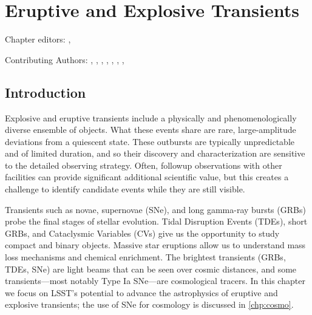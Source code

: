 
\chapter[Eruptive and Explosive Transients]{Eruptive and Explosive Transients}
\def\chpname{transients}\label{chp:\chpname}


Chapter editors:
,

Contributing Authors:
,
,
,
,
,
,
,

\section{Introduction}


Explosive and eruptive transients include a physically and
phenomenologically diverse ensemble of objects.   What these events share
are rare, large-amplitude deviations from a quiescent state.  These
outbursts are typically unpredictable and of limited duration, and so their
discovery and characterization are sensitive to the detailed observing
strategy.  Often, followup observations with other facilities can provide
significant additional scientific value, but this creates a challenge to
identify candidate events while they are still visible.

Transients such as novae, supernovae (SNe), and long gamma-ray bursts (GRBs)
probe the final stages of stellar evolution. Tidal Disruption Events
(TDEs), short GRBs, and
Cataclysmic Variables (CVs) give us the opportunity to study
compact and binary objects. Massive star eruptions allow us to understand
mass loss mechanisms and chemical enrichment. 
The brightest transients (GRBs, TDEs,
SNe) are light beams that can be seen over cosmic distances, and some
transients---most notably Type Ia SNe---are cosmological tracers.  
In this chapter we focus on LSST's potential to advance the astrophysics of
eruptive and explosive transients; the use of SNe for cosmology is
discussed in \autoref{chp:cosmo}.

